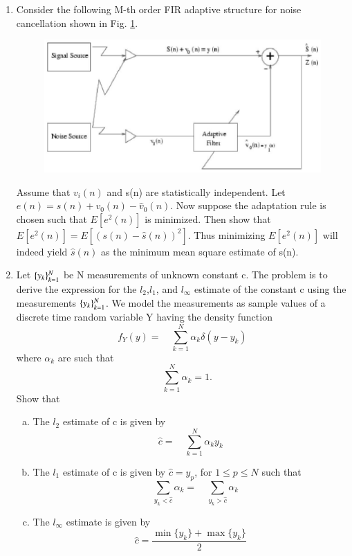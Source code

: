 \documentclass[journal,12pt,twocolumn]{IEEEtran}
\begin{document}
\begin{enumerate}[1.]
\item Consider the following M-th order FIR adaptive structure for noise cancellation shown in Fig. \ref{fig:hw1}.
\begin{figure}
\centering
\includegraphics[width=\columnwidth]{./figs/figure1.eps}
\caption{}
\label{fig:hw1}
\end{figure}
%
Assume that $v_i(n)$ and s(n) are statistically independent. Let $e(n)=s(n)+v_0(n)-\hat{v}_0(n)$. Now suppose the adaptation rule is chosen such that $E[e^2(n)]$ is minimized. Then show that $E[e^2(n)]=E[(s(n)-\hat{s}(n))^2]$. Thus minimizing $E[e^2(n)]$ will indeed yield $\hat{s}(n)$ as the minimum mean square estimate of s(n).
%
\item Let $\{\large{y}_k\}_{k=1}^N$ be N measurements of unknown constant c. The problem is to derive the expression for the $l_2$,$l_1$, and $l_\infty$ estimate of the constant c using the measurements $\{\large{y}_k\}_{k=1}^N$.
We model the measurements as sample values of a discrete time random variable Y having the density function
\begin{equation}
f_Y(y)=\quad\sum_{k=1}^{N}{\alpha_k}{\delta(y-y_k)}
\end{equation}
where $\alpha_k$ are such that 
\begin{equation}
\quad\sum_{k=1}^{N}{\alpha_k}=1.
\end{equation}
%
Show that
\begin{enumerate}[(a)]
\item The $l_2$ estimate of c is given by
\begin{equation}
\hat{c}=\quad\sum_{k=1}^{N}{\alpha_k}{y_k}
\end{equation}
%
\item The $l_1$ estimate of c is given by $\hat{c}={y_p}$, for $1\leq{p}\leq{N}$ such that
\begin{equation}
\quad\sum_{y_k<{\hat{c}}}\alpha_{k}=\quad\sum_{y_k>{\hat{c}}}\alpha_{k}
\end{equation}
%
\item The $l_\infty$ estimate is given by
\begin{equation}
\hat{c}=\frac{\min\{{y_k}\}+\max\{y_k\}}{2}
\end{equation}


\end{enumerate}
\end{enumerate}
\end{document}
